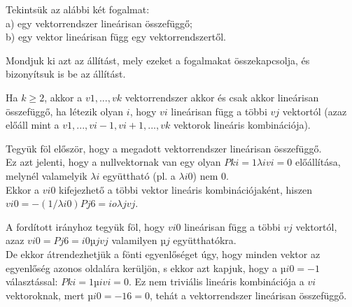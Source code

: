 \begin{frame}
  \begin{tcolorbox}[title={2. (4p)}]
     Tekintsük az alábbi két fogalmat:\\
     a) egy vektorrendszer lineárisan összefüggő;\\
     b) egy vektor lineárisan függ egy vektorrendszertől.\\
     \mmedskip
     
     Mondjuk ki azt az állítást, mely ezeket a fogalmakat összekapcsolja, és bizonyítsuk is be az állítást.
  \tcblower
  
    Ha $k ≥ 2$, akkor a $v1,...,vk$ vektorrendszer akkor és csak akkor lineárisan összefüggő, ha létezik olyan $i$, hogy $vi$ lineárisan függ a többi $vj$ vektortól (azaz előáll mint a $v1,...,vi−1,vi+1,...,vk$ vektorok lineáris kombinációja).\\
    \mmedskip
    
    Tegyük föl először, hogy a megadott vektorrendszer lineárisan összefüggő.\\
    Ez azt jelenti, hogy a nullvektornak van egy olyan $Pk i=1 λivi = 0$ előállítása, melynél valamelyik $λi$ együttható (pl. a $λi0$) nem $0$.\\
    
    Ekkor a $vi0$ kifejezhető a többi vektor lineáris kombinációjaként, hiszen $vi0 = −(1/λi0)Pj6=io λjvj$.\\
    \mmedskip
    
    A fordított irányhoz tegyük föl, hogy $vi0$ lineárisan függ a többi $vj$ vektortól, azaz $vi0 = Pj6=i0 µjvj$ valamilyen $µj$ együtthatókra.\\
    
    De ekkor átrendezhetjük a fönti egyenlőséget úgy, hogy minden vektor az egyenlőség azonos oldalára kerüljön, s ekkor azt kapjuk, hogy a $µi0 = −1$ választással: $Pk i=1 µivi = 0$. Ez nem triviális lineáris kombinációja a $vi$ vektoroknak, mert $µi0 = −1 6= 0$, tehát a vektorrendszer lineárisan összefüggő.
  \end{tcolorbox}
\end{frame}



